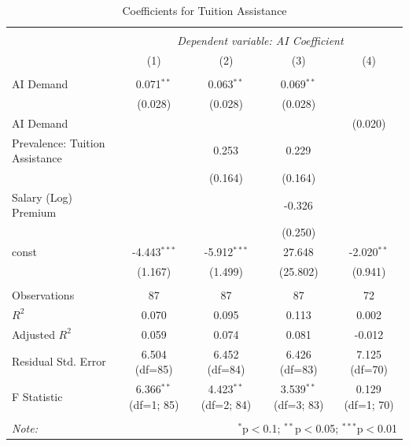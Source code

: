 \begin{table}[!htbp] \centering
  \caption{Coefficients for Tuition Assistance}
\begin{tabular}{@{\extracolsep{5pt}}lcccc}
\\[-1.8ex]\hline
\hline \\[-1.8ex]
& \multicolumn{4}{c}{\textit{Dependent variable: AI Coefficient}} \
\cr \cline{2-5}
\\[-1.8ex] & (1) & (2) & (3) & (4) \\
\hline \\[-1.8ex]
 AI Demand & 0.071$^{**}$ & 0.063$^{**}$ & 0.069$^{**}$ & \\
& (0.028) & (0.028) & (0.028) & \\
 AI Demand %
& & & & (0.020) \\
 Prevalence: Tuition Assistance & & 0.253$^{}$ & 0.229$^{}$ & \\
& & (0.164) & (0.164) & \\
 Salary (Log) Premium & & & -0.326$^{}$ & \\
& & & (0.250) & \\
 const & -4.443$^{***}$ & -5.912$^{***}$ & 27.648$^{}$ & -2.020$^{**}$ \\
& (1.167) & (1.499) & (25.802) & (0.941) \\
\hline \\[-1.8ex]
 Observations & 87 & 87 & 87 & 72 \\
 $R^2$ & 0.070 & 0.095 & 0.113 & 0.002 \\
 Adjusted $R^2$ & 0.059 & 0.074 & 0.081 & -0.012 \\
 Residual Std. Error & 6.504 (df=85) & 6.452 (df=84) & 6.426 (df=83) & 7.125 (df=70) \\
 F Statistic & 6.366$^{**}$ (df=1; 85) & 4.423$^{**}$ (df=2; 84) & 3.539$^{**}$ (df=3; 83) & 0.129$^{}$ (df=1; 70) \\
\hline
\hline \\[-1.8ex]
\textit{Note:} & \multicolumn{4}{r}{$^{*}$p$<$0.1; $^{**}$p$<$0.05; $^{***}$p$<$0.01} \\
\end{tabular}
\end{table}